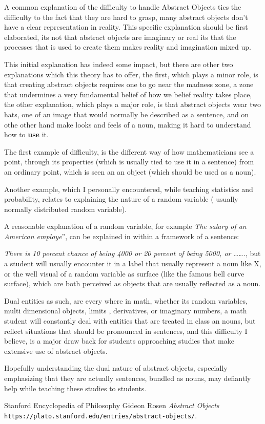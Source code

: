 \documentclass[10pt]{article}
\begin{document}
A common explanation of the difficulty to handle Abstract Objects ties the difficulty to the fact that they are hard to grasp, many abstract objects don’t have a clear representation in reality. This specific explanation should be first elaborated, its not that abstract objects are imaginary or real its that the processes that is used to create them makes reality and imagination mixed up.\par
This initial explanation has indeed some impact, but there are other two explanations which this theory has to offer, the first, which plays a minor role, is that creating abstract objects requires one to go near the madness zone, a zone that undermines a very fundamental belief of how we belief reality takes place, the other explanation, which plays a major role, is that abstract objects wear two hats, one of an image that would normally be described as a sentence, and on othe other hand make looks and feels of a noun, making it hard to understand how to \textbf{use} it.\par
The first  example of difficulty, is the different way of how mathematicians see a point, through its properties (which is usually tied to use it in a sentence) from an ordinary point, which is seen an an object (which should be used as a noun).\par
Another example, which I personally encountered, while teaching statistics and probability, relates to  explaining the nature of a random variable ( usually normally distributed random variable).\par
A reasonable explanation of a random variable, for example \textit{The salary of an American employe}”, can be explained in within a framework of a sentence:\par
 \textit{There is 10 percent chance of being 4000 or 20 percent of being 5000, or …….}, but a student will usually encounter it in a label that usually represent a noun like X, or the well visual of a random variable as surface (like the famous bell curve surface), which are both perceived as objects that are usually reflected as a noun.\par
Dual entities as such, are every where in math, whether its random variables, multi dimensional objects, limits , derivatives, or imaginary numbers, a math student will constantly deal with entities that are treated in class an nouns, but reflect situations that should be pronounced in sentences, and this difficulty I believe, is a major draw back for students approaching studies that make extensive use of abstract objects.\par 
Hopefully understanding the dual nature of abstract objects, especially emphasizing that they are actually sentences, bundled as nouns,  may defiantly help while teaching these studies to students.\par

\begin{thebibliography}{9}
 
Stanford Encyclopedia of Philosophy 
Gideon Rosen
\textit{Abstract Objects}
\\\texttt{https://plato.stanford.edu/entries/abstract-objects/}. 

\end{thebibliography}
\end{document}
